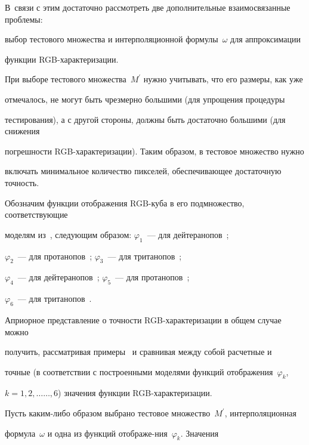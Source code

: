 В~связи с этим достаточно рассмотреть две дополнительные взаимосвязанные проблемы:


выбор тестового множества и интерполяционной формулы~$\omega$ для аппроксимации


функции RGB-ха\-рак\-те\-ри\-зации.





При выборе тестового множества~$M^\prime$ нужно учитывать, что его размеры, как уже


отмечалось, не могут быть чрезмерно большими (для упрощения процедуры


тестирования), а с другой стороны, должны быть достаточно большими (для снижения


погрешности RGB-характеризации). Таким образом, в тестовое множество нужно


включать минимальное количество пикселей, обеспечивающее достаточную точность.





Обозначим функции отображения RGB-куба в его подмножество, соответствующие


моделям из~\cite{2-6, 3-6}, следующим образом: $\varphi_1$~--- для дейтеранопов~\cite{2-6};


$\varphi_2$~--- для протанопов~\cite{2-6}; $\varphi_3$~---  для тританопов~\cite{2-6};


$\varphi_4$~---  для дейтеранопов~\cite{3-6}; $\varphi_5$~---  для протанопов~\cite{3-6};


$\varphi_6$~---  для тританопов~\cite{3-6}.





Априорное представление о точности RGB-ха\-рак\-те\-ри\-за\-ции в общем случае  можно


получить, рассматривая примеры~\cite{2-6, 3-6} и сравнивая между собой расчетные и


точные (в соответствии с построенными моделями функций отображения~$\varphi_k$,


$k=1,2,\ldots$\linebreak $\ldots ,6$) значения функции RGB-ха\-рак\-те\-ри\-за\-ции.





Пусть каким-либо образом выбрано тестовое множест\-во~$M^\prime$, интерполяционная


формула~$\omega$ и одна из функций отображе-\linebreak ния~$\varphi_k$. Значения


